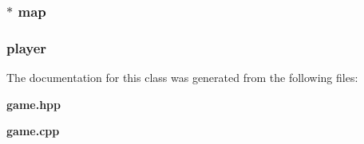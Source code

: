 \subsubsection{$\ast$ {\bf map}\hspace{0.3cm}{\tt  [protected]}}\label{classGame_p3}


\subsubsection{ {\bf player}\hspace{0.3cm}{\tt  [protected]}}\label{classGame_p2}




The documentation for this class was generated from the following files:\begin{CompactItemize}
\item 
{\bf game.hpp}\item 
{\bf game.cpp}\end{CompactItemize}
